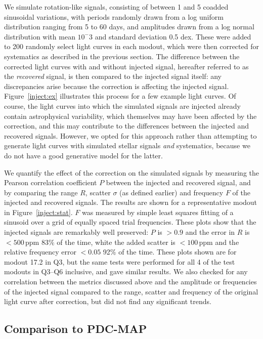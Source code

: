 \documentclass[useAMS,usenatbib]{mn2e}
\begin{document}
We simulate rotation-like signals, consisting of between 1 and 5 coadded
sinusoidal variations, with periods randomly drawn from a log uniform
distribution ranging from 5 to 60 days, and amplitudes drawn from a
log normal distribution with mean $10^-3$ and standard deviation 0.5
dex. These were added to 200 randomly select light curves in each
modout, which were then corrected for systematics as described in the
previous section. The difference between the corrected light curves
with and without injected signal, hereafter referred to as the
\emph{recovered} signal, is then compared to the injected
signal itself: any discrepancies arise because the correction is affecting
the injected signal. Figure~\ref{inject:ex} illustrates this process
for a few example light curves. Of course, the light curves into which the
simulated signals are injected already contain astrophysical
variability, which themselves may have been affected by the
correction, and this may contribute to the differences between the
injected and recovered signals. However, we opted for this approach
rather than attempting to generate light curves with simulated stellar
signals \emph{and} systematics, because we do not have a good
generative model for the latter. 

We quantify the effect of the correction on the simulated signals by
measuring the Pearson correlation coefficient $P$ between the injected
and recovered signal, and by comparing the range $R$, scatter $\sigma$
(as defined earlier) and frequency $F$ of the injected and recovered
signals. The results are shown for a representative modout in
Figure~\ref{inject:stat}. $F$ was measured by simple least squares
fitting of a sinusoid over a grid of equally spaced trial
frequencies. These plots show that the injected signals are remarkably
well preserved: $P$ is $>0.9$ and the error in $R$ is $<500$\,ppm 83\%
of the time, white the added scatter is $<100$\,ppm and the relative
frequency error $<0.05$ 92\% of the time. These plots shown are for
modout 17.2 in Q3, but the same tests were performed for all 4 of the
test modouts in Q3--Q6 inclusive, and gave similar results. We also
checked for any correlation between the metrics discussed above and the
amplitude or frequencies of the injected signal compared to the range,
scatter and frequency of the original light curve after correction,
but did not find any significant trends.

\subsection{Comparison to PDC-MAP}
\label{sec:comp}
\end{document}
